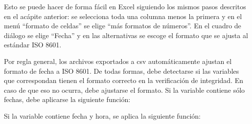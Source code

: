 \documentclass[
  spanish,
]{book}
\newenvironment{Shaded}{\begin{snugshade}}{\end{snugshade}}
\newcommand{\AttributeTok}[1]{\textcolor[rgb]{0.77,0.63,0.00}{#1}}
\newcommand{\CommentTok}[1]{\textcolor[rgb]{0.56,0.35,0.01}{\textit{#1}}}
\newcommand{\ErrorTok}[1]{\textcolor[rgb]{0.64,0.00,0.00}{\textbf{#1}}}
\newcommand{\FunctionTok}[1]{\textcolor[rgb]{0.00,0.00,0.00}{#1}}
\newcommand{\NormalTok}[1]{#1}
\newcommand{\SpecialCharTok}[1]{\textcolor[rgb]{0.00,0.00,0.00}{#1}}
\newcommand{\StringTok}[1]{\textcolor[rgb]{0.31,0.60,0.02}{#1}}
\begin{document}
Esto se puede hacer de forma fácil en Excel siguiendo los mismos pasos descritos en el acápite anterior: se selecciona toda una columna menos la primera y en el menú ``formato de celdas'' se elige ``más formatos de números''. En el cuadro de diálogo se elige ``Fecha'' y en las alternativas se escoge el formato que se ajusta al estándar ISO 8601.

Por regla general, los archivos exportados a csv automáticamente ajustan el formato de fecha a ISO 8601. De todas formas, debe detectarse si las variables que correspondan tienen el formato correcto en la verificación de integridad. En caso de que eso no ocurra, debe ajustarse el formato. Si la variable contiene sólo fechas, debe aplicarse la siguiente función:

\begin{Shaded}
\end{Shaded}

Si la variable contiene fecha y hora, se aplica la siguiente función:

\begin{Shaded}
\end{Shaded}
\end{document}
